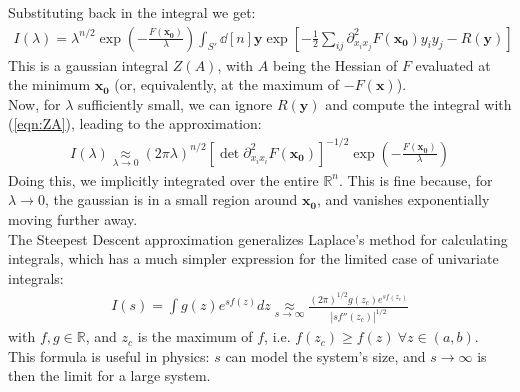 \documentclass[../template.tex]{subfiles}
\begin{document}
Substituting back in the integral we get:
\begin{align*}
    I(\lambda) = \lambda^{n/2} \exp\left(-\frac{F(\bm{x_0})}{\lambda} \right) \int_{S'}\dd[n]{\bm{y}} \exp\left[-\frac{1}{2} \sum_{ij} \partial^2_{x_ix_j} F(\bm{x_0}) y_i y_j - R(\bm{y}) \right]
\end{align*}
This is a gaussian integral $Z(A)$, with $A$ being the Hessian of $F$ evaluated at the minimum $\bm{x_0}$ (or, equivalently, at the maximum of $-F(\bm{x})$).\\
Now, for $\lambda$ sufficiently small, we can ignore $R(\bm{y})$ and compute the integral with (\ref{eqn:ZA}), leading to the approximation:  
\begin{align}
    I(\lambda) \underset{\lambda \to 0}{\approx} (2\pi \lambda)^{n/2} [\operatorname{det} \partial^2_{x_i x_i} F(\bm{x_0})]^{-1/2} \exp\left(-\frac{F(\bm{x_0})}{\lambda} \right)
    \label{eqn:steepest-descent}
\end{align} 
Doing this, we implicitly integrated over the entire $\mathbb{R}^n$. This is fine because, for $\lambda \to 0$, the gaussian is  in a small region around $\bm{x_0}$, and vanishes exponentially moving further away.\\  

The Steepest Descent approximation generalizes Laplace's method for calculating integrals, which has a much simpler expression for the limited case of univariate integrals:
\begin{align}
    I(s) = \int g(z) e^{s f(z)} dz \underset{s \to \infty }{\approx}  \frac{(2\pi)^{1/2} g(z_c) e^{s f(z_c)}}{|s f''(z_c)|^{1/2}}
    \label{eqn:laplace-formula}
\end{align}
with $f, g \in \mathbb{R}$, and $z_c$ is the maximum of $f$, i.e. $f(z_c) \geq f(z)\> \forall z \in (a,b)$.\\
This formula is useful in physics: $s$ can model the system's size, and $s \to\infty$ is then the limit for a large system.\\
\end{document}
